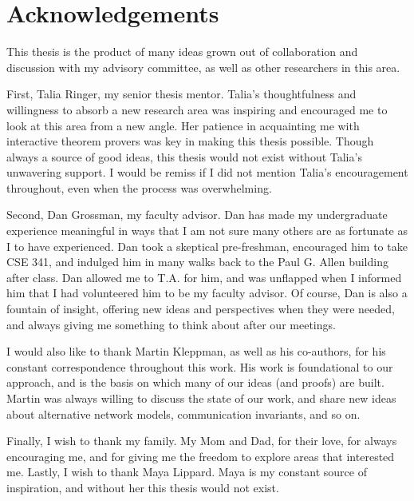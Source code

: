 \chapter{Acknowledgements}

This thesis is the product of many ideas grown out of collaboration and
discussion with my advisory committee, as well as other researchers in this
area.

First, Talia Ringer, my senior thesis mentor. Talia's thoughtfulness and
willingness to absorb a new research area was inspiring and encouraged me to
look at this area from a new angle. Her patience in acquainting me with
interactive theorem provers was key in making this thesis possible. Though
always a source of good ideas, this thesis would not exist without Talia's
unwavering support. I would be remiss if I did not mention Talia's encouragement
throughout, even when the process was overwhelming.

Second, Dan Grossman, my faculty advisor. Dan has made my undergraduate
experience meaningful in ways that I am not sure many others are as fortunate as
I to have experienced. Dan took a skeptical pre-freshman, encouraged him to take
CSE 341, and indulged him in many walks back to the Paul G. Allen building after
class. Dan allowed me to T.A. for him, and was unflapped when I informed him
that I had volunteered him to be my faculty advisor. Of course, Dan is also a
fountain of insight, offering new ideas and perspectives when they were needed,
and always giving me something to think about after our meetings.

I would also like to thank Martin Kleppman, as well as his co-authors, for his
constant correspondence throughout this work. His work is foundational to our
approach, and is the basis on which many of our ideas (and proofs) are built.
Martin was always willing to discuss the state of our work, and share new ideas
about alternative network models, communication invariants, and so on.

Finally, I wish to thank my family. My Mom and Dad, for their love, for always
encouraging me, and for giving me the freedom to explore areas that interested
me.  Lastly, I wish to thank Maya Lippard. Maya is my constant source of
inspiration, and without her this thesis would not exist.
